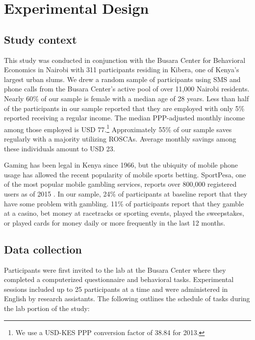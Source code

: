 \documentclass[12pt]{article}
\begin{document}
\section{Experimental Design} \label{sec:design}

	\subsection{Study context}

		This study was conducted in conjunction with the Busara Center for Behavioral Economics in Nairobi with 311 participants residing in Kibera, one of Kenya's largest urban slums. We drew a random sample of participants using SMS and phone calls from the Busara Center's active pool of over 11,000 Nairobi residents. Nearly 60\% of our sample is female with a median age of 28 years. Less than half of the participants in our sample reported that they are employed with only 5\% reported receiving a regular income. The median PPP-adjusted monthly income among those employed is USD 77.\footnote{We use a USD-KES PPP conversion factor of 38.84 for 2013.} Approximately 55\% of our sample saves regularly with a majority utilizing ROSCAs. Average monthly savings among these individuals amount to USD 23. %

		Gaming has been legal in Kenya since 1966, but the ubiquity of mobile phone usage has allowed the recent popularity of mobile sports betting. SportPesa, one of the most popular mobile gambling services, reports over 800,000 registered users as of 2015 . In our sample, 24\% of participants at baseline report that they have some problem with gambling. 11\% of participants report that they gamble at a casino, bet money at racetracks or sporting events, played the sweepstakes, or played cards for money daily or more frequently in the last 12 months.


	\subsection{Data collection}

		Participants were first invited to the lab at the Busara Center where they completed a computerized questionnaire and behavioral tasks. Experimental sessions included up to 25 participants at a time and were administered in English by research assistants. The following outlines the schedule of tasks during the lab portion of the study:
\end{document}
